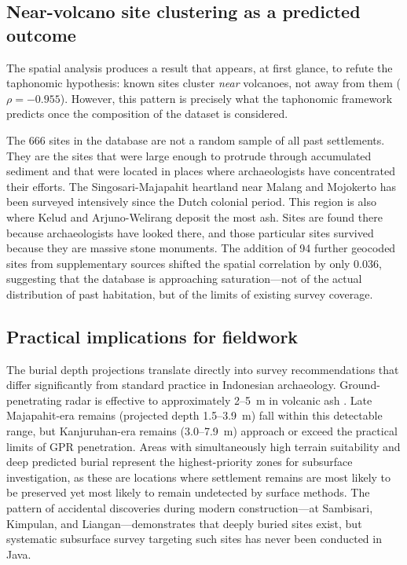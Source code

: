 \documentclass[12pt,a4paper]{article}
\begin{document}
\subsection{Near-volcano site clustering as a predicted outcome}

The spatial analysis produces a result that appears, at first glance, to refute the taphonomic hypothesis: known sites cluster \textit{near} volcanoes, not away from them ($\rho = -0.955$). However, this pattern is precisely what the taphonomic framework predicts once the composition of the dataset is considered.

The 666 sites in the database are not a random sample of all past settlements. They are the sites that were large enough to protrude through accumulated sediment and that were located in places where archaeologists have concentrated their efforts. The Singosari-Majapahit heartland near Malang and Mojokerto has been surveyed intensively since the Dutch colonial period. This region is also where Kelud and Arjuno-Welirang deposit the most ash. Sites are found there because archaeologists have looked there, and those particular sites survived because they are massive stone monuments. The addition of 94 further geocoded sites from supplementary sources shifted the spatial correlation by only 0.036, suggesting that the database is approaching saturation---not of the actual distribution of past habitation, but of the limits of existing survey coverage.

\subsection{Practical implications for fieldwork}

The burial depth projections translate directly into survey recommendations that differ significantly from standard practice in Indonesian archaeology. Ground-penetrating radar is effective to approximately 2--5~m in volcanic ash \citep{conyers2004}. Late Majapahit-era remains (projected depth 1.5--3.9~m) fall within this detectable range, but Kanjuruhan-era remains (3.0--7.9~m) approach or exceed the practical limits of GPR penetration. Areas with simultaneously high terrain suitability and deep predicted burial represent the highest-priority zones for subsurface investigation, as these are locations where settlement remains are most likely to be preserved yet most likely to remain undetected by surface methods. The pattern of accidental discoveries during modern construction---at Sambisari, Kimpulan, and Liangan---demonstrates that deeply buried sites exist, but systematic subsurface survey targeting such sites has never been conducted in Java.
\end{document}

